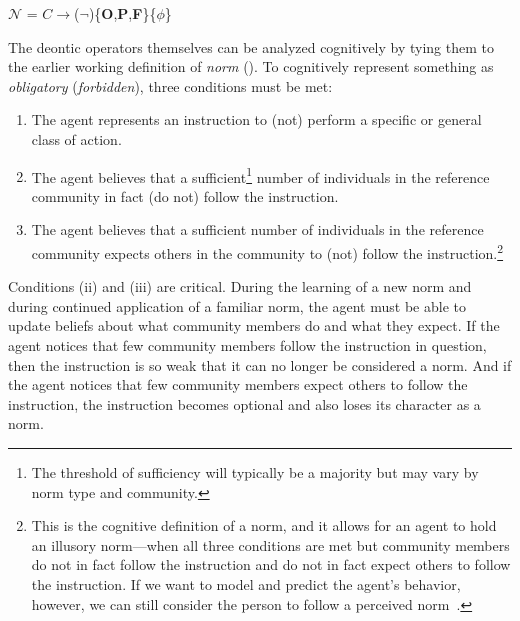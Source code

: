 \documentclass[12pt]{article}
\begin{document}
\vskip 0.1in
$\mathcal{N}$ = $C \rightarrow$($\neg$)\{{\bf O},{\bf P},{\bf F}\}\{$\phi$\}
\vskip 0.1in

The deontic operators themselves can be analyzed cognitively by tying
them to the earlier working definition of {\em norm} (\pageref{workdef}).  To
cognitively represent something as {\em obligatory} ({\em forbidden}),
three conditions must be met:
\vspace{-1mm}

\begin{enumerate}[label= (\roman*), leftmargin=*,align=left]
\vspace{-1mm}

\item The agent represents an instruction to (not) perform a specific
  or general class of action. 
\vspace{-1mm}

\item The agent believes that a sufficient\footnote{ The threshold of
    sufficiency will typically be a majority but may vary by norm type
    and community.}  number of individuals in the reference community
  in fact (do not) follow the instruction.
\vspace{-1mm}

\item The agent believes that a sufficient number of individuals in
  the reference community expects others in the community to (not)
  follow the instruction.\footnote{ This is the cognitive definition
    of a norm, and it allows for an agent to hold an illusory
    norm---when all three conditions are met but community members do
    not in fact follow the instruction and do not in fact expect
    others to follow the instruction.  If we want to model and predict
    the agent's behavior, however, we can still consider the person to
    follow a perceived norm~\citep{aarts03}.}

\end{enumerate}
\vspace{-1mm}

Conditions (ii) and (iii) are critical.  During the learning of a new
norm and during continued application of a familiar norm, the agent
must be able to update beliefs about what community members do and
what they expect. If the agent notices that few community members
follow the instruction in question, then the instruction is so weak
that it can no longer be considered a norm.  And if
the agent notices that few community members expect others to follow
the instruction, the instruction becomes optional and also loses its
character as a norm.
\end{document}
